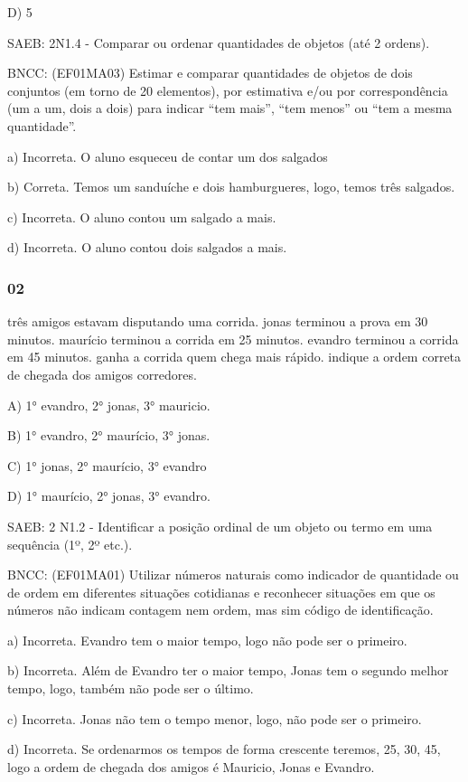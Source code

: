 \begin{itemize}
\begin{itemize}
D) 5

SAEB: 2N1.4 - Comparar ou ordenar quantidades de objetos (até 2 ordens).

BNCC: (EF01MA03) Estimar e comparar quantidades de objetos de dois
conjuntos (em torno de 20 elementos), por estimativa e/ou por
correspondência (um a um, dois a dois) para indicar ``tem mais'', ``tem
menos'' ou ``tem a mesma quantidade''.

a) Incorreta. O aluno esqueceu de contar um dos salgados

b) Correta. Temos um sanduíche e dois hamburgueres, logo, temos três
salgados.

c) Incorreta. O aluno contou um salgado a mais.

d) Incorreta. O aluno contou dois salgados a mais.

\subsubsection{02}\label{section-133}

três amigos estavam disputando uma corrida. jonas terminou a prova em 30
minutos. maurício terminou a corrida em 25 minutos. evandro terminou a
corrida em 45 minutos. ganha a corrida quem chega mais rápido. indique a
ordem correta de chegada dos amigos corredores.

A) 1° evandro, 2° jonas, 3° mauricio.

B) 1° evandro, 2° maurício, 3° jonas.

C) 1° jonas, 2° maurício, 3° evandro

D) 1° maurício, 2° jonas, 3° evandro.

SAEB: 2 N1.2 - Identificar a posição ordinal de um objeto ou termo em
uma sequência (1º, 2º etc.).

BNCC: (EF01MA01) Utilizar números naturais como indicador de quantidade
ou de ordem em diferentes situações cotidianas e reconhecer situações em
que os números não indicam contagem nem ordem, mas sim código de
identificação.

a) Incorreta. Evandro tem o maior tempo, logo não pode ser o primeiro.

b) Incorreta. Além de Evandro ter o maior tempo, Jonas tem o segundo
melhor tempo, logo, também não pode ser o último.

c) Incorreta. Jonas não tem o tempo menor, logo, não pode ser o
primeiro.

d) Incorreta. Se ordenarmos os tempos de forma crescente teremos, 25,
30, 45, logo a ordem de chegada dos amigos é Mauricio, Jonas e Evandro.


\end{itemize}
\end{itemize}
